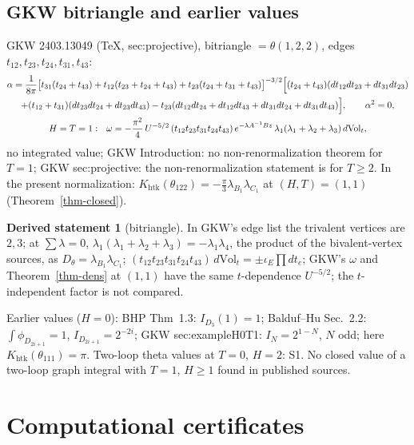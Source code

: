\documentclass[10pt,a4paper]{article}
\numberwithin{equation}{section}
\theoremstyle{definition}
\newtheorem{dstatement}[theorem]{Derived statement}
\theoremstyle{remark}
\newcommand{\htk}{\mathrm{htk}}
\begin{document}
\subsection{GKW bitriangle and earlier values}
GKW 2403.13049 (TeX, sec:projective), bitriangle $=\theta(1,2,2)$, edges $t_{12},t_{23},t_{24},t_{31},t_{43}$:
\begin{gather}
\alpha=\frac1{8\pi}\big[t_{31}(t_{24}+t_{43})+t_{12}(t_{23}+t_{24}+t_{43})+t_{23}(t_{24}+t_{31}+t_{43})\big]^{-3/2}\Big[(t_{24}+t_{43})(dt_{12}dt_{23}+dt_{31}dt_{23})\notag\\
+(t_{12}+t_{31})(dt_{23}dt_{24}+dt_{23}dt_{43})-t_{23}(dt_{12}dt_{24}+dt_{12}dt_{43}+dt_{31}dt_{24}+dt_{31}dt_{43})\Big],\qquad\alpha^2=0,\\
H=T=1:\ \ \omega=-\frac{\pi^2}4\,U^{-5/2}\,(t_{12}t_{23}t_{31}t_{24}t_{43})\,e^{-\lambda A^{-1}Bz}\,\lambda_1(\lambda_1+\lambda_2+\lambda_3)\,d\mathrm{Vol}_t,
\end{gather}
no integrated value; GKW Introduction: no non-renormalization theorem for $T=1$; GKW sec:projective: the non-renormalization statement is for $T\ge2$. In the present normalization: $K_\htk(\theta_{122})=-\frac\pi3\lambda_{B_1}\lambda_{C_1}$ at $(H,T)=(1,1)$ (Theorem~\ref{thm-closed}).
\begin{dstatement}[bitriangle]
In GKW's edge list the trivalent vertices are $2,3$; at $\sum\lambda=0$, $\lambda_1(\lambda_1+\lambda_2+\lambda_3)=-\lambda_1\lambda_4$, the product of the bivalent-vertex sources, as $D_\theta=\lambda_{B_1}\lambda_{C_1}$; $(t_{12}t_{23}t_{31}t_{24}t_{43})\,d\mathrm{Vol}_t=\pm\iota_E\prod dt_e$; GKW's $\omega$ and Theorem~\ref{thm-dens} at $(1,1)$ have the same $t$-dependence $U^{-5/2}$; the $t$-independent factor is not compared.
\end{dstatement}
Earlier values ($H=0$): BHP Thm~1.3: $I_{D_3}(1)=1$; Balduf--Hu Sec.~2.2: $\int\phi_{D_{2i+1}}=1$, $I_{D_{2i+1}}=2^{-2i}$; GKW sec:exampleH0T1: $I_N=2^{1-N}$, $N$ odd; here $K_\htk(\theta_{111})=\pi$. Two-loop theta values at $T=0$, $H=2$: S1. No closed value of a two-loop graph integral with $T=1$, $H\ge1$ found in published sources.

\appendix
\section{Computational certificates}\label{app-cert}
\end{document}
